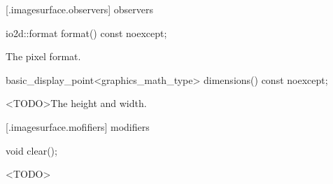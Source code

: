  [\iotwod.imagesurface.observers] { observers}

%
\begin{itemdecl}
io2d::format format() const noexcept;
\end{itemdecl}
\begin{itemdescr}
\pnum
\returns
The pixel format.
\end{itemdescr}

%
\begin{itemdecl}
basic_display_point<graphics_math_type> dimensions() const noexcept;
\end{itemdecl}
\begin{itemdescr}
\pnum
\returns
<TODO>The height and width.
\end{itemdescr}

 [\iotwod.imagesurface.mofifiers] { modifiers}

%
\begin{itemdecl}
void clear();
\end{itemdecl}
\begin{itemdescr}
\pnum
\effects
<TODO>
\end{itemdescr}

